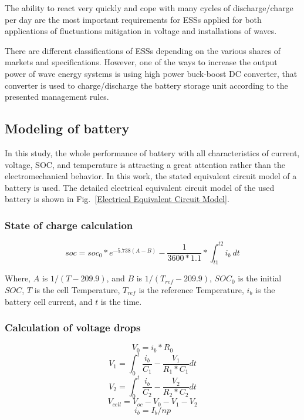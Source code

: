 \documentclass[conference]{IEEEtran}
\begin{document}
The ability to react very quickly and cope with many cycles of discharge/charge per day are the most important requirements for ESSs applied for both applications of fluctuations mitigation in voltage and installations of waves.


There are different classifications of ESSs depending on the various shares of markets and specifications. However, one of the ways to increase the output power of wave energy systems is using high power buck-boost DC converter, that converter is used to charge/discharge the battery storage unit according to the presented management rules.
%
\subsection{Modeling of battery}
In this study, the whole performance of battery with all characteristics of current, voltage, SOC, and temperature is attracting a great attention rather than the electromechanical behavior.  In this work, the stated equivalent circuit model of a battery is used. The detailed electrical equivalent circuit model of the used battery is shown in Fig.~\ref{Electrical Equivalent Circuit Model}.
\subsubsection{State of charge calculation}
\begin{equation}
	soc=soc_{0} * e^{-5.738(A-B)}-\frac{1}{3600*1.1}* \int_{t1}^{t2} i_b\ dt\label{Soc}
\end{equation}

Where, $A$ is $1/(T-209.9)$, and $B$ is $1/(T_{ref}-209.9)$, $SOC_0$ is the initial $SOC$, $T$ is the cell Temperature, $T_{ref}$ is the reference Temperature, $i_{b}$ is the battery cell current, and $t$ is the time.
\subsubsection{Calculation of voltage drops}
\begin{equation}
	V_0 = i_b * R_0\label{vo}
\end{equation}
\begin{equation}
	V_1=\int_{0}^{t} \frac{i_b}{C_1}-\frac{V_1}{R_1 * C_{1}} dt \label{v1}
\end{equation}
\begin{equation}
	V_2=\int_{0}^{t} \frac{i_b}{C_2}-\frac{V_2}{R_2 * C_{2}} dt \label{v2}
\end{equation}
\begin{equation}
	V_{cell}= V_{oc}-V_0-V_1-V_2\label{vcell}
\end{equation}
\begin{equation}
	i_b = I_b/np\label{ib}
\end{equation}
\end{document}
